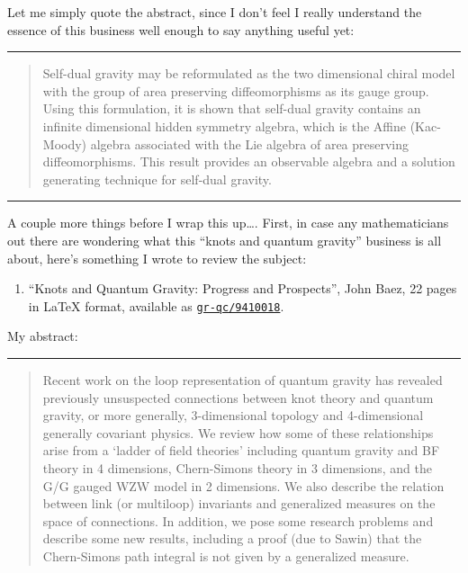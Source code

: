 \documentclass{article}
\def\tightlist{}
\begin{document}
Let me simply quote the abstract, since I don't feel I really understand
the essence of this business well enough to say anything useful yet:

\begin{center}\rule{0.5\linewidth}{0.5pt}\end{center}

\begin{quote}
Self-dual gravity may be reformulated as the two dimensional chiral
model with the group of area preserving diffeomorphisms as its gauge
group. Using this formulation, it is shown that self-dual gravity
contains an infinite dimensional hidden symmetry algebra, which is the
Affine (Kac-Moody) algebra associated with the Lie algebra of area
preserving diffeomorphisms. This result provides an observable algebra
and a solution generating technique for self-dual gravity.
\end{quote}

\begin{center}\rule{0.5\linewidth}{0.5pt}\end{center}

A couple more things before I wrap this up\ldots. First, in case any
mathematicians out there are wondering what this ``knots and quantum
gravity'' business is all about, here's something I wrote to review the
subject:

\begin{enumerate}
\def\labelenumi{\arabic{enumi})}
\setcounter{enumi}{5}
\tightlist
\item
  ``Knots and Quantum Gravity: Progress and Prospects'', John Baez, 22
  pages in LaTeX format, available as
  \href{http://xxx.lanl.gov/abs/gr-qc/9410018}{\texttt{gr-qc/9410018}}.
\end{enumerate}

My abstract:

\begin{center}\rule{0.5\linewidth}{0.5pt}\end{center}

\begin{quote}
Recent work on the loop representation of quantum gravity has revealed
previously unsuspected connections between knot theory and quantum
gravity, or more generally, 3-dimensional topology and 4-dimensional
generally covariant physics. We review how some of these relationships
arise from a `ladder of field theories' including quantum gravity and BF
theory in 4 dimensions, Chern-Simons theory in 3 dimensions, and the G/G
gauged WZW model in 2 dimensions. We also describe the relation between
link (or multiloop) invariants and generalized measures on the space of
connections. In addition, we pose some research problems and describe
some new results, including a proof (due to Sawin) that the Chern-Simons
path integral is not given by a generalized measure.
\end{quote}
\end{document}
